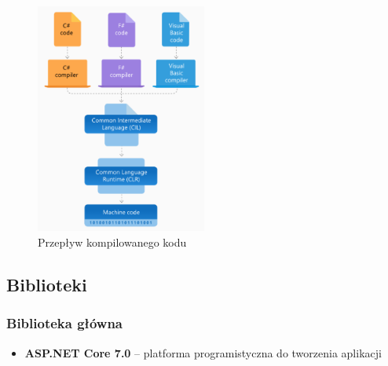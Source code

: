 \documentclass[a4paper,twoside,12pt]{book}
\begin{document}
\begin{figure}[h]
    \centering
    \includegraphics[width=0.5\textwidth]{compiler.png}
    \caption{Przepływ kompilowanego kodu}
    \label{Kompilator}
\end{figure}

\subsection{Biblioteki}
\subsubsection{Biblioteka główna}
    \begin{itemize}
        \item \textbf{ASP.NET Core 7.0} -- platforma programistyczna do tworzenia aplikacji 
    \end{itemize}
\end{document}

